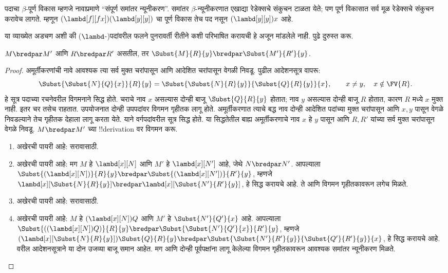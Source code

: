 \documentclass[../../../include/open-logic-section]{subfiles}
\begin{document}
पदाचा $\beta$-पूर्ण विकास म्हणजे नावाप्रमाणे
``संपूर्ण समांतर न्यूनीकरण''. समांतर $\beta$-न्यूनीकरणात
एखाद्या रेडेक्सचे संकुचन टाळता येते; पण पूर्ण विकासात
सर्व मूळ रेडेक्सचे संकुचन करावेच लागते. म्हणून
$(\lambd[f][fx])(\lambd[y][y])$ चा पूर्ण विकास तेच
पद नसून $(\lambd[y][y])x$ आहे.

\begin{editorial}
  या व्याख्येत अडचण अशी की ($\lambd$-)पदांवरील फलने
  पुनरावर्ती रीतीने कशी परिभाषित करायची हे अजून
  मांडलेले नाही. पुढे दुरुस्त करू.
\end{editorial}

\begin{lem}
  $M \bredpar M'$ आणि $R \bredpar R'$ असतील, तर $\Subst{M}{R}{y}
  \bredpar \Subst{M'}{R'}{y}$.
\end{lem}

\begin{proof}
अमूर्तीकरणांची नावे आवश्यक त्या सर्व मुक्त चरांपासून
आणि आदेशित चरांपासून वेगळी निवडू. पुढील आदेशनसूत्र वापरू:
\[
\Subst{\Subst{N}{Q}{x}}{R}{y}
=\Subst{\Subst{N}{R}{y}}{\Subst{Q}{R}{y}}{x},
\qquad x\ne y,\quad x\notin\FV{R}.
\]
हे सूत्र पदाच्या रचनेवरील विगमनाने सिद्ध होते. चराचे नाव
$x$ असल्यास दोन्ही बाजू $\Subst{Q}{R}{y}$ होतात;
नाव $y$ असल्यास दोन्ही बाजू $R$ होतात, कारण $R$ मध्ये
$x$ मुक्त नाही. इतर चर तसेच राहतात. उपयोजनात दोन्ही
उपपदांवर विगमन गृहीतक लागू होते. अमूर्तीकरणात त्याचे
बद्ध नाव दोन्ही आदेशित पदांच्या मुक्त चरांपासून आणि
$x,y$ पासून वेगळे निवडल्याने तेच गृहीतक देहाला लागू
करता येते. याने वर्गपदांवरील सूत्र सिद्ध होते.
या सिद्धतेतील बाह्य अमूर्तीकरणाचे नाव $x$ हे $y$ पासून
आणि $R,R'$ यांच्या सर्व मुक्त चरांपासून वेगळे निवडू.
  $M \bredpar M'$ च्या !!{derivation} वर विगमन करू.
  \begin{enumerate}
    \item अखेरची पायरी  आहे: सरावासाठी.
    \item अखेरची पायरी  आहे: मग $M$ हे
      $\lambd[x][N]$ आणि $M'$ हे $\lambd[x][N']$ आहे,
      जेथे $N \bredpar N'$. आपल्याला
      $\Subst{(\lambd[x][N])}{R}{y} \bredpar
      \Subst{(\lambd[x][N'])}{R'}{y}$, म्हणजे
      $\lambd[x][\Subst{N}{R}{y}] \bredpar
      \lambd[x][\Subst{N'}{R'}{y}]$, हे सिद्ध करायचे आहे.
      ते  आणि विगमन गृहीतकावरून
      लगेच मिळते.
    \item अखेरची पायरी  आहे: सरावासाठी.
    \item अखेरची पायरी  आहे: $M$ हे
      $(\lambd[x][N])Q$ आणि $M'$ हे $\Subst{N'}{Q'}{x}$ आहे.
      आपल्याला $\Subst{((\lambd[x][N])Q)}{R}{y} \bredpar
      \Subst{\Subst{N'}{Q'}{x}}{R'}{y}$, म्हणजे
      $(\lambd[x][\Subst{N}{R}{y}])\Subst{Q}{R}{y} \bredpar
      \Subst{\Subst{N'}{R'}{y}}{\Subst{Q'}{R'}{y}}{x}$,
      हे सिद्ध करायचे आहे. वरील आदेशनसूत्राने या दोन
      उजव्या बाजू समान आहेत. मग 
      आणि दोन्ही पूर्वपक्षांना लागू केलेल्या विगमन गृहीतकावरून
      आवश्यक समांतर न्यूनीकरण मिळते.
  \end{enumerate}
\end{proof}
\end{document}
